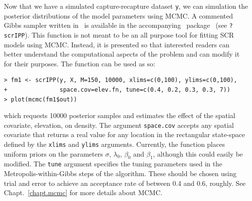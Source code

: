 Now that we have a simulated capture-recapture dataset \texttt{y}, %
we can simulation the posterior distributions of the model parameters
using MCMC.  A commented Gibbs sampler written
in \R~is available in the accompanying \R~package \scrbook~(see
\texttt{?scrIPP}). This function is not meant to be an all purpose
tool for fitting SCR models using MCMC. Instead, it is presented so
that interested readers can better understand the computational
aspects of the problem and can modify it for their purposes.
The function can be used as so:
\begin{small}
\begin{verbatim}
> fm1 <- scrIPP(y, X, M=150, 10000, xlims=c(0,100), ylims=c(0,100),
+               space.cov=elev.fn, tune=c(0.4, 0.2, 0.3, 0.3, 7))
> plot(mcmc(fm1$out))
\end{verbatim}
\end{small}
which requests 10000 posterior samples and estimates the effect of the
spatial covariate, elevation, on density.
The argument \verb+space.cov+ accepts any spatial
covariate that returns a real value for any location in the
rectangular state-space defined by the \verb+xlims+ and \verb+ylims+
arguments. Currently, the function
places uniform priors on the parameters $\sigma$, $\lambda_0$,
$\beta_0$ and $\beta_1$, although this could easily be modified.
The \verb+tune+ argument specifies the tuning parameters used in the
Metropolis-within-Gibbs steps of the algorithm. These should be chosen
using trial and error to achieve an acceptance rate of between 0.4 and
0.6, roughly. See Chapt.~\ref{chapt.mcmc} for more details about MCMC.

